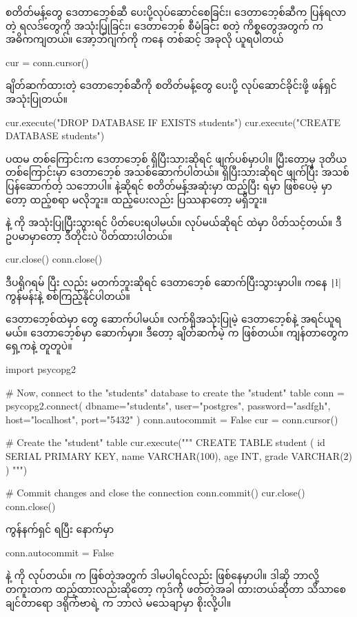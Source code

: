  စတိတ်မန့်တွေ ဒေတာဘေ့စ်ဆီ ပေးပို့လုပ်ဆောင်စေခြင်း၊ ဒေတာဘေ့စ်ဆီက ပြန်ရလာတဲ့ ရလဒ်တွေကို အသုံးပြုခြင်း၊ ဒေတာဘေ့စ်  စီမံခြင်း စတဲ့ ကိစ္စတွေအတွက်  က အဓိကကျတယ်။  အော့ဘ်ဂျက်ကို  ကနေ တစ်ဆင့် အခုလို ယူရပါတယ်
%
\begin{py}
cur = conn.cursor()
\end{py}
%

ချိတ်ဆက်ထားတဲ့ ဒေတာဘေ့စ်ဆီကို  စတိတ်မန့်တွေ ပေးပို့ လုပ်ဆောင်ခိုင်းဖို့  ဖန်ရှင် အသုံးပြုတယ်။  
%
\begin{py}
cur.execute("DROP DATABASE IF EXISTS students")
cur.execute("CREATE DATABASE students")
\end{py}
%
 ပထမ တစ်ကြောင်းက  ဒေတာဘေ့စ် ရှိပြီးသားဆိုရင် ဖျက်ပစ်မှာပါ။ ပြီးတော့မှ ဒုတိယ တစ်ကြောင်းမှာ ဒေတာဘေ့စ် အသစ်ဆောက်ပါတယ်။ ရှိပြီးသားဆိုရင် ဖျက်ပြီး အသစ်ပြန်ဆောက်တဲ့ သဘောပါ။  နဲ့ဆိုရင်  စတိတ်မန့်အဆုံးမှာ \fCode{;} ထည့်ပြီး  ရမှာ ဖြစ်ပေမဲ့  မှာတော့ ထည့်စရာ မလိုဘူး။ ထည့်ပေးလည်း ပြဿနာတော့ မရှိဘူး။


 နဲ့  ကို အသုံးပြုပြီးသွားရင် ပိတ်ပေးရပါမယ်။  လုပ်မယ်ဆိုရင်  ထဲမှာ ပိတ်သင့်တယ်။ ဒီဥပမာမှာတော့ ဒီတိုင်းပဲ ပိတ်ထားပါတယ်။
%
\begin{py}
cur.close()
conn.close()
\end{py}
%
ဒီပရိုဂရမ်  ပြီး  လည်း မတက်ဘူးဆိုရင်  ဒေတာဘေ့စ် ဆောက်ပြီးသွားမှာပါ။  ကနေ \texttt|\l| ကွန်မန်းနဲ့ စစ်ကြည့်နိုင်ပါတယ်။









ဒေတာဘေ့စ်ထဲမှာ  တွေ ဆောက်ပါမယ်။ လက်ရှိအသုံးပြုမဲ့ ဒေတာဘေ့စ်နဲ့  အရင်ယူရမယ်။  ဒေတာဘေ့စ်မှာ   ဆောက်မှာ။ ဒီတော့ ချိတ်ဆက်မဲ့  က  ဖြစ်တယ်။ ကျန်တာတွေက ရှေ့ကနဲ့ တူတူပဲ။
%
\begin{py}
import psycopg2

# Now, connect to the "students" database to create the "student" table
conn = psycopg2.connect(
    dbname="students",
    user="postgres",
    password="asdfgh",
    host="localhost",
    port="5432"
)
conn.autocommit = False
cur = conn.cursor()

# Create the "student" table
cur.execute("""
    CREATE TABLE student (
        id SERIAL PRIMARY KEY,
        name VARCHAR(100),
        age INT,
        grade VARCHAR(2)
    )
""")

# Commit changes and close the connection
conn.commit()
cur.close()
conn.close()
\end{py}
%
ကွန်နက်ရှင် ရပြီး နောက်မှာ
%
\begin{py}
conn.autocommit = False
\end{py}
%
နဲ့  ကို  လုပ်တယ်။   က  ဖြစ်တဲ့အတွက် ဒါမပါရင်လည်း  ဖြစ်နေမှာပါ။ ဒါဆို ဘာလို့ တကူးတက ထည့်ထားလည်းဆိုတော့ ကုဒ်ကို ဖတ်တဲ့အခါ  ထားတယ်ဆိုတာ သိသာစေချင်တာရော ဒရိုက်ဗာရဲ့  က  ဘာလဲ မသေချာမှာ စိုးလို့ပါ။  

